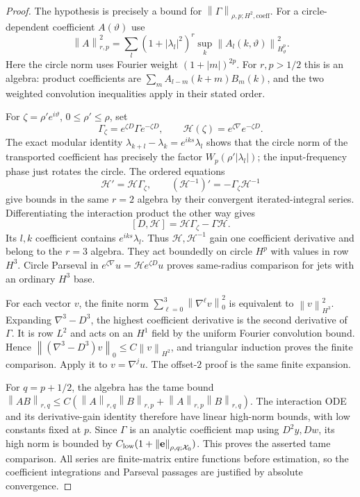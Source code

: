 \documentclass[11pt,a4paper]{article}
\numberwithin{equation}{section}
\theoremstyle{remark}
\newcommand{\norm}[1]{\left\lVert #1\right\rVert}
\newcommand{\Xzero}{\mathcal X_0}
\begin{document}
\begin{proof}
The hypothesis is precisely a bound for
\(\norm\Gamma_{\rho,p;H^2,\mathrm{coeff}}\).
For a circle-dependent coefficient \(A(\vartheta)\) use
\[
 \norm A_{r,p}^2=\sum_l(1+|\lambda_l|^2)^r
                       \sup_k\norm{A_l(k,\vartheta)}_{H^p_\vartheta}^2 .
\]
Here the circle norm uses Fourier weight \((1+|m|)^{2p}\).
For \(r,p>1/2\) this is an algebra: product coefficients are
\(\sum_m A_{l-m}(k+m)B_m(k)\), and the two weighted convolution
inequalities apply in their stated order.

For \(\zeta=\rho' e^{i\vartheta}\), \(0\leq\rho'\leq\rho\), set
\[
 \Gamma_\zeta=e^{\zeta D}\Gamma e^{-\zeta D},\qquad
 \mathcal H(\zeta)=e^{\zeta\nabla}e^{-\zeta D}.
\]
The exact modular identity
\(\lambda_{k+l}-\lambda_k=e^{iks}\lambda_l\) shows that the circle
norm of the transported coefficient has precisely the factor
\(W_p(\rho'|\lambda_l|)\); the input-frequency phase just rotates
the circle. The ordered equations
\[
 \mathcal H'=\mathcal H\Gamma_\zeta,\qquad
 (\mathcal H^{-1})'=-\Gamma_\zeta\mathcal H^{-1}
\]
give bounds in the same \(r=2\) algebra by their convergent
iterated-integral series. Differentiating the interaction product
the other way gives
\[
 [D,\mathcal H]=\mathcal H\Gamma_\zeta-\Gamma\mathcal H .
\]
Its \(l,k\) coefficient contains \(e^{iks}\lambda_l\).
Thus \(\mathcal H,\mathcal H^{-1}\) gain one coefficient derivative
and belong to the \(r=3\) algebra. They act boundedly on
circle \(H^p\) with values in row \(H^3\). Circle Parseval in
\(e^{\zeta\nabla}u=\mathcal H e^{\zeta D}u\) proves same-radius
comparison for jets with an ordinary \(H^3\) base.

For each vector \(v\), the finite norm
\(\sum_{\ell=0}^3\norm{\nabla^\ell v}_0^2\) is equivalent to
\(\norm v_{H^3}^2\). Expanding \(\nabla^3-D^3\), the highest
coefficient derivative is the second derivative of \(\Gamma\).
It is row \(L^2\) and acts on an \(H^1\) field by the uniform
Fourier convolution bound. Hence
\(\norm{(\nabla^3-D^3)v}_0\leq C\norm v_{H^2}\), and triangular
induction proves the finite comparison. Apply it to
\(v=\nabla^ju\). The offset-\(2\) proof is the same finite expansion.

For \(q=p+1/2\), the algebra has the tame bound
\(\norm{AB}_{r,q}\leq C(\norm A_{r,q}\norm B_{r,p}
                     +\norm A_{r,p}\norm B_{r,q})\).
The interaction ODE and its derivative-gain identity therefore have
linear high-norm bounds, with low constants fixed at \(p\).
Since \(\Gamma\) is an analytic coefficient map using \(D^2y,Dw\),
its high norm is bounded by
\(C_{\rm low}(1+\norm{\mathbf e}_{\rho,q;\Xzero})\).
This proves the asserted tame comparison.
All series are finite-matrix entire functions before estimation,
so the coefficient integrations and Parseval passages are justified
by absolute convergence.
\end{proof}
\end{document}
